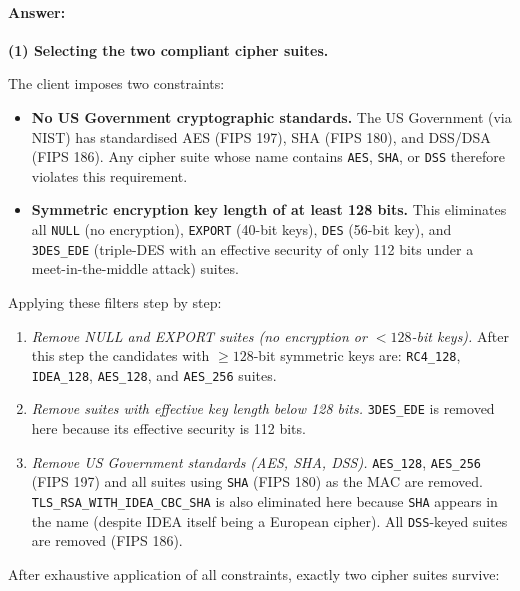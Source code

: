 \documentclass[]{scrartcl}
\begin{document}
\paragraph{Answer:}{

\textbf{(1) Selecting the two compliant cipher suites.}

The client imposes two constraints:
\begin{itemize}
    \item \textbf{No US Government cryptographic standards.}
          The US Government (via NIST) has standardised AES (FIPS 197), SHA (FIPS 180),
          and DSS/DSA (FIPS 186). Any cipher suite whose name contains \texttt{AES},
          \texttt{SHA}, or \texttt{DSS} therefore violates this requirement.
    \item \textbf{Symmetric encryption key length of at least 128 bits.}
          This eliminates all \texttt{NULL} (no encryption), \texttt{EXPORT} (40-bit keys),
          \texttt{DES} (56-bit key), and \texttt{3DES\_EDE} (triple-DES with an effective
          security of only 112 bits under a meet-in-the-middle attack) suites.
\end{itemize}

Applying these filters step by step:

\begin{enumerate}
    \item[\textit{Step 1.}] \textit{Remove NULL and EXPORT suites (no encryption or $< 128$-bit keys).}
          After this step the candidates with $\ge 128$-bit symmetric keys are:
          \texttt{RC4\_128}, \texttt{IDEA\_128}, \texttt{AES\_128}, and \texttt{AES\_256} suites.
    \item[\textit{Step 2.}] \textit{Remove suites with effective key length below 128 bits.}
          \texttt{3DES\_EDE} is removed here because its effective security is 112 bits.
    \item[\textit{Step 3.}] \textit{Remove US Government standards (AES, SHA, DSS).}
          \texttt{AES\_128}, \texttt{AES\_256} (FIPS 197) and all suites using \texttt{SHA}
          (FIPS 180) as the MAC are removed.
          \texttt{TLS\_RSA\_WITH\_IDEA\_CBC\_SHA} is also eliminated here because
          \texttt{SHA} appears in the name (despite IDEA itself being a European cipher).
          All \texttt{DSS}-keyed suites are removed (FIPS 186).
\end{enumerate}

After exhaustive application of all constraints, exactly two cipher suites survive:

}
\end{document}
